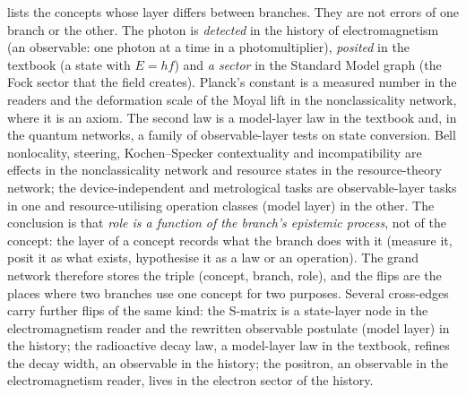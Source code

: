 \documentclass[11pt,a4paper,twoside,openany]{report}
\theoremstyle{plain}
\theoremstyle{definition}
\theoremstyle{remark}
\begin{document}
\begin{table}[htbp]\centering\small
\caption{The \NnFlips{} role flips: concepts whose layer differs between branches.}\label{tab:flips}

\end{table}
 lists the \NnFlips{} concepts whose layer differs between branches. They are not errors of one branch or the other. The photon is \emph{detected} in the history of electromagnetism (an observable: one photon at a time in a photomultiplier), \emph{posited} in the textbook (a state with $E=hf$) and \emph{a sector} in the Standard Model graph (the Fock sector that the field creates). Planck's constant is a measured number in the readers and the deformation scale of the Moyal lift in the nonclassicality network, where it is an axiom. The second law is a model-layer law in the textbook and, in the quantum networks, a family of observable-layer tests on state conversion. Bell nonlocality, steering, Kochen--Specker contextuality and incompatibility are effects in the nonclassicality network and resource states in the resource-theory network; the device-independent and metrological tasks are observable-layer tasks in one and resource-utilising operation classes (model layer) in the other. The conclusion is that \emph{role is a function of the branch's epistemic process}, not of the concept: the layer of a concept records what the branch does with it (measure it, posit it as what exists, hypothesise it as a law or an operation). The grand network therefore stores the triple (concept, branch, role), and the flips are the places where two branches use one concept for two purposes. Several cross-edges carry further flips of the same kind: the S-matrix is a state-layer node in the electromagnetism reader and the rewritten observable postulate (model layer) in the history; the radioactive decay law, a model-layer law in the textbook, refines the decay width, an observable in the history; the positron, an observable in the electromagnetism reader, lives in the electron sector of the history.
\end{document}

